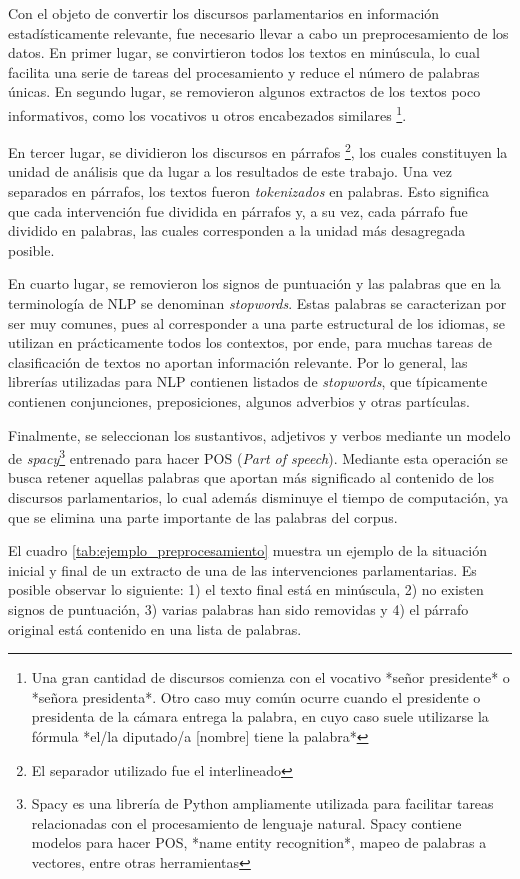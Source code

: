\documentclass[
  12pt,
]{article}
\begin{document}
Con el objeto de convertir los discursos parlamentarios en información
estadísticamente relevante, fue necesario llevar a cabo un
preprocesamiento de los datos. En primer lugar, se convirtieron todos
los textos en minúscula, lo cual facilita una serie de tareas del
procesamiento y reduce el número de palabras únicas. En segundo lugar,
se removieron algunos extractos de los textos poco informativos, como
los vocativos u otros encabezados similares
\footnote{Una gran cantidad de discursos comienza con el vocativo *señor presidente* o *señora presidenta*. Otro caso muy común ocurre cuando el presidente o presidenta de la cámara entrega la palabra, en cuyo caso suele utilizarse la fórmula *el/la diputado/a [nombre] tiene la palabra*}.

En tercer lugar, se dividieron los discursos en párrafos
\footnote{El separador utilizado fue el interlineado}, los cuales
constituyen la unidad de análisis que da lugar a los resultados de este
trabajo. Una vez separados en párrafos, los textos fueron
\emph{tokenizados} en palabras. Esto significa que cada intervención fue
dividida en párrafos y, a su vez, cada párrafo fue dividido en palabras,
las cuales corresponden a la unidad más desagregada posible.

En cuarto lugar, se removieron los signos de puntuación y las palabras
que en la terminología de NLP se denominan \emph{stopwords}. Estas
palabras se caracterizan por ser muy comunes, pues al corresponder a una
parte estructural de los idiomas, se utilizan en prácticamente todos los
contextos, por ende, para muchas tareas de clasificación de textos no
aportan información relevante. Por lo general, las librerías utilizadas
para NLP contienen listados de \emph{stopwords}, que típicamente
contienen conjunciones, preposiciones, algunos adverbios y otras
partículas.

Finalmente, se seleccionan los sustantivos, adjetivos y verbos mediante
un modelo de
\emph{spacy}\footnote{Spacy es una librería de Python ampliamente utilizada para facilitar tareas relacionadas con el procesamiento de lenguaje natural. Spacy contiene modelos para hacer POS, *name entity recognition*, mapeo de palabras a vectores, entre otras herramientas}
entrenado para hacer POS (\emph{Part of speech}). Mediante esta
operación se busca retener aquellas palabras que aportan más significado
al contenido de los discursos parlamentarios, lo cual además disminuye
el tiempo de computación, ya que se elimina una parte importante de las
palabras del corpus.

El cuadro \ref{tab:ejemplo_preprocesamiento} muestra un ejemplo de la
situación inicial y final de un extracto de una de las intervenciones
parlamentarias. Es posible observar lo siguiente: 1) el texto final está
en minúscula, 2) no existen signos de puntuación, 3) varias palabras han
sido removidas y 4) el párrafo original está contenido en una lista de
palabras.
\end{document}
